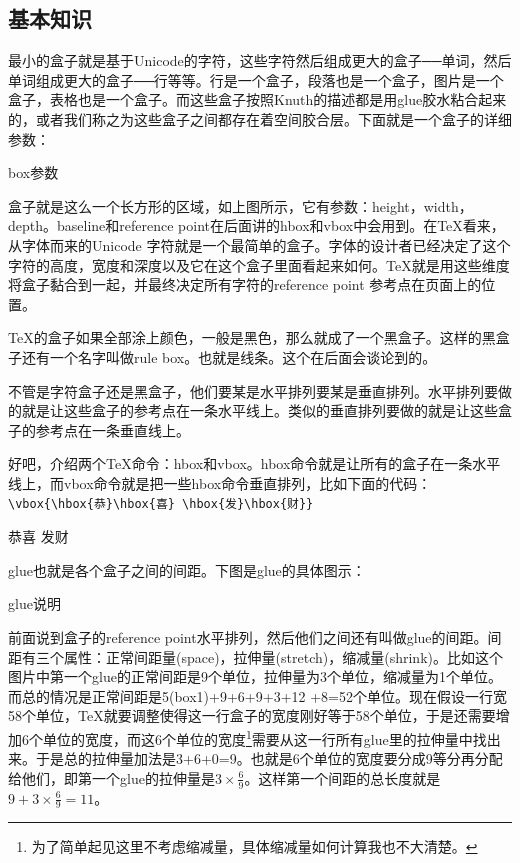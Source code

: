 \documentclass[12pt,oneside]{book}
\begin{document}
\begin{common-format}
\subsection{基本知识}
最小的盒子就是基于Unicode的字符，这些字符然后组成更大的盒子──单词，然后单词组成更大的盒子──行等等。行是一个盒子，段落也是一个盒子，图片是一个盒子，表格也是一个盒子。而这些盒子按照Knuth的描述都是用glue胶水粘合起来的，或者我们称之为这些盒子之间都存在着空间胶合层。下面就是一个盒子的详细参数：

\begin{linefig}[0.8]{box参数}
\label{fig:box参数}
\end{linefig}

盒子就是这么一个长方形的区域，如上图所示，它有参数：height，width，depth。baseline和reference point在后面讲的hbox和vbox中会用到。在\TeX 看来，从字体而来的Unicode 字符就是一个最简单的盒子。字体的设计者已经决定了这个字符的高度，宽度和深度以及它在这个盒子里面看起来如何。\TeX 就是用这些维度将盒子黏合到一起，并最终决定所有字符的reference point 参考点在页面上的位置。

\TeX 的盒子如果全部涂上颜色，一般是黑色，那么就成了一个黑盒子。这样的黑盒子还有一个名字叫做rule box。也就是线条。这个在后面会谈论到的。

不管是字符盒子还是黑盒子，他们要某是水平排列要某是垂直排列。水平排列要做的就是让这些盒子的参考点在一条水平线上。类似的垂直排列要做的就是让这些盒子的参考点在一条垂直线上。

好吧，介绍两个\TeX 命令：hbox和vbox。hbox命令就是让所有的盒子在一条水平线上，而vbox命令就是把一些hbox命令垂直排列，比如下面的代码：\\
\verb+\vbox{\hbox{恭}\hbox{喜} \hbox{发}\hbox{财}}+

\vbox{\hbox{恭}\hbox{喜} \hbox{发}\hbox{财}}

glue也就是各个盒子之间的间距。下图是glue的具体图示：
\begin{linefig}{glue说明}
\label{fig:glue说明}
\end{linefig}
前面说到盒子的reference point水平排列，然后他们之间还有叫做glue的间距。间距有三个属性：正常间距量(space)，拉伸量(stretch)，缩减量(shrink)。比如这个图片中第一个glue的正常间距是9个单位，拉伸量为3个单位，缩减量为1个单位。而总的情况是正常间距是5(box1)+9+6+9+3+12\- +8=52个单位。现在假设一行宽58个单位，\TeX 就要调整使得这一行盒子的宽度刚好等于58个单位，于是还需要增加6个单位的宽度，而这6个单位的宽度\footnote{为了简单起见这里不考虑缩减量，具体缩减量如何计算我也不大清楚。}需要从这一行所有glue里的拉伸量中找出来。于是总的拉伸量加法是3+6+0=9。也就是6个单位的宽度要分成9等分再分配给他们，即第一个glue的拉伸量是$3\times\frac { 6 }{ 9 } $。这样第一个间距的总长度就是$9+3\times\frac { 6 }{ 9 } =11$。


\end{common-format}
\end{document}
